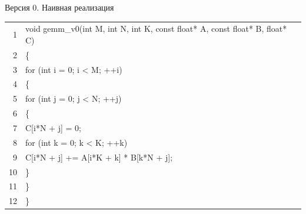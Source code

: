 \documentclass[aspectratio=169, 11pt]{beamer}
\newcommand{\K}[1]{\textcolor{kw}{#1}}   %
\newcommand{\T}[1]{\textcolor{tp}{#1}}   %
\newcommand{\N}[1]{\textcolor{nm}{#1}}   %
\newcommand{\V}[1]{\textcolor{vr}{#1}}   %
\begin{document}
\begin{frame}[fragile]{Версия 0. Наивная реализация}
	\ttfamily\small
	\setlength{\baselineskip}{1.1em}
	\setlength{\parindent}{0pt}
	
	\begingroup
	\setlength{\fboxsep}{7pt}%
	\colorbox{codebg}{%
		\begin{minipage}{\dimexpr\linewidth-2\fboxsep\relax}
			\begin{tabular}{@{}r@{\hspace{1.2em}}l@{}}
				\textcolor{ln}{1} & \K{void} \V{gemm\_v0}(\T{int} \V{M}, \T{int} \V{N}, \T{int} \V{K}, \T{const} \T{float*} \V{A}, \T{const} \T{float*} \V{B}, \T{float*} \V{C}) \\
				\textcolor{ln}{2} & \{ \\
				\textcolor{ln}{3} & \hspace{2em}\K{for} (\T{int} \V{i} = \N{0}; \V{i} < \V{M}; ++\V{i}) \\
				\textcolor{ln}{4} & \hspace{2em}\{ \\
				\textcolor{ln}{5} & \hspace{4em}\K{for} (\T{int} \V{j} = \N{0}; \V{j} < \V{N}; ++\V{j}) \\
				\textcolor{ln}{6} & \hspace{4em}\{ \\
				\textcolor{ln}{7} & \hspace{6em}\V{C}[\V{i}*\V{N} + \V{j}] = \N{0}; \\
				\textcolor{ln}{8} & \hspace{6em}\K{for} (\T{int} \V{k} = \N{0}; \V{k} < \V{K}; ++\V{k}) \\
				\textcolor{ln}{9} & \hspace{8em}\V{C}[\V{i}*\V{N} + \V{j}] += \V{A}[\V{i}*\V{K} + \V{k}] * \V{B}[\V{k}*\V{N} + \V{j}]; \\
				\textcolor{ln}{10} & \hspace{4em}\} \\
				\textcolor{ln}{11} & \hspace{2em}\} \\
				\textcolor{ln}{12} & \}
			\end{tabular}
		\end{minipage}%
	}%
	\endgroup
\end{frame}
\end{document}
